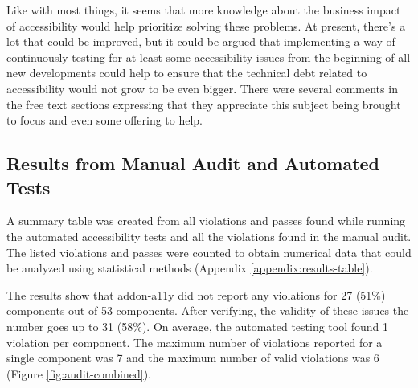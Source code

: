 \documentclass{master_thesis}
\begin{document}
Like with most things, it seems that more knowledge about the business impact of accessibility would help prioritize solving these problems. At present, there's a lot that could be improved, but it could be argued that implementing a way of continuously testing for at least some accessibility issues from the beginning of all new developments could help to ensure that the technical debt related to accessibility would not grow to be even bigger. There were several comments in the free text sections expressing that they appreciate this subject being brought to focus and even some offering to help.

\subsection{Results from Manual Audit and Automated Tests}

A summary table was created from all violations and passes found while running the automated accessibility tests and all the violations found in the manual audit. The listed violations and passes were counted to obtain numerical data that could be analyzed using statistical methods (Appendix \ref{appendix:results-table}).

The results show that addon-a11y did not report any violations for 27 (51\%) components out of 53 components. After verifying, the validity of these issues the number goes up to 31 (58\%). On average, the automated testing tool found 1 violation per component. The maximum number of violations reported for a single component was 7 and the maximum number of valid violations was 6 (Figure \ref{fig:audit-combined}).
\end{document}
